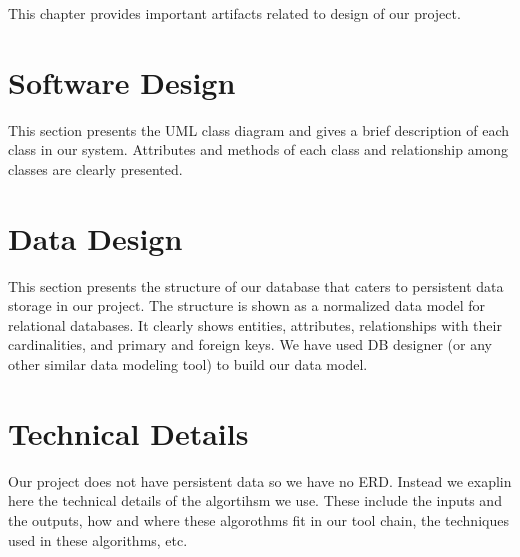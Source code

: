 
This chapter provides important artifacts related to design of our project.

\section{Software Design}

This section presents the UML class diagram and gives a brief description of each class in our system. Attributes and methods of each class and relationship among classes are clearly presented.


\section{Data Design}

This section presents the structure of our database that caters to persistent data storage in our project. The structure is shown as a normalized data model for relational databases. It clearly shows entities, attributes, relationships with their cardinalities, and primary and foreign keys. We have used DB designer (or any other similar data modeling tool) to build our data model.

 
\section{Technical Details}

Our project does not have persistent data so we have no ERD. Instead we exaplin here the technical details of the algortihsm we use. These include the inputs and the outputs, how and where these algorothms fit in our tool chain, the techniques used in these algorithms, etc.